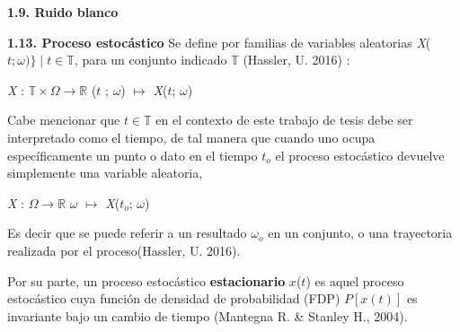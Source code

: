 {
\noindent
\Large  \textbf{1.9. Ruido blanco} 
}


{
\noindent
\Large  \textbf{1.13. Proceso estocástico} 
}
\newline
Se define por familias de variables aleatorias  \textit{X}($\mathit{t}; \mathit{\omega})\} \mid \mathit{t} \in \mathbb{T}$, para un conjunto indicado $\mathbb{T}$ (Hassler, U. 2016) :

\begin{center}
\hspace{1.7cm}\textit{X} : $\mathbb{T} \times \mathit{\Omega} \rightarrow \mathbb{R} $\newline 
($\mathit{t}$ ; $\mathit{\omega}$) $\mapsto$ \textit{X}($\mathit{t}$; $\omega$)
\end{center}


Cabe mencionar que $ \mathit{t} \in \mathbb{T}$ en el contexto de este trabajo de tesis debe ser interpretado como el \guillemotleft tiempo\guillemotright, de tal manera que cuando uno ocupa específicamente un punto o dato en el tiempo $\mathit{t}_{o}$ el proceso estocástico devuelve simplemente una variable aleatoria, \newline

\begin{center}
\hspace{1.77cm}\textit{X} : $ \mathit{\Omega} \rightarrow \mathbb{R} $\newline 
$\mathit{\omega}$ $\mapsto$ \textit{X}($\mathit{t_{o}}$; $\omega$)
\end{center}

Es decir que se puede referir a un resultado $\mathit{\omega_{o}}$ en un conjunto, o una \guillemotleft trayectoria \guillemotright realizada por el proceso(Hassler, U. 2016). 
\newline

Por su parte, un proceso estocástico \textbf{estacionario} $\mathit{x}$($\mathit{t}$) es aquel proceso estocástico cuya función de densidad de probabilidad (FDP) $P[\mathit{x}(\mathit{t})]$ es invariante bajo un cambio de tiempo (Mantegna R. \& Stanley H., 2004).
\newline


